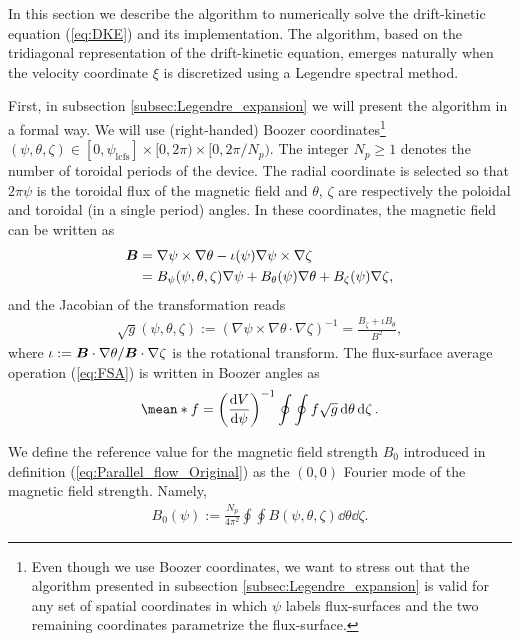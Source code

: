  In this section we describe the algorithm to numerically solve the drift-kinetic equation (\ref{eq:DKE}) and its implementation. The algorithm, based on the tridiagonal representation of the drift-kinetic equation, emerges naturally when the velocity coordinate $\xi$ is discretized using a Legendre spectral method.
 
 First, in subsection \ref{subsec:Legendre_expansion} we will present the algorithm in a formal way. We will use (right-handed) Boozer coordinates\footnote{Even though we use Boozer coordinates, we want to stress out that the algorithm presented in subsection \ref{subsec:Legendre_expansion} is valid for any set of spatial coordinates in which $\psi$ labels flux-surfaces and the two remaining coordinates parametrize the flux-surface.} $(\psi,\theta,\zeta)\in[0,\psi_{\text{lcfs}}]\times[0,2\pi)\times[0,2\pi/N_p)$. The integer $N_p\ge 1$ denotes the number of toroidal periods of the device. The radial coordinate is selected so that $2\pi \psi$ is the toroidal flux of the magnetic field and $\theta$, $\zeta$ are respectively the poloidal and toroidal (in a single period) angles. In these coordinates, the magnetic field can be written as
 \begin{align}
 	\vb*{B} & = \nabla\psi \times \nabla\theta - \iota(\psi) \nabla\psi \times \nabla\zeta 
 	\nonumber\\
 	& = B_\psi(\psi,\theta,\zeta) \nabla \psi + B_\theta(\psi) \nabla \theta + B_\zeta(\psi) \nabla \zeta,
 	\label{eq:Magnetic_field_Boozer}
 \end{align}
 and the Jacobian of the transformation reads 
 \begin{align}
 	\sqrt{g}(\psi,\theta,\zeta) 
 	:=( 
 	\nabla\psi \times \nabla \theta \cdot \nabla\zeta  
 	)^{-1} 
 	= 
 	\frac{B_\zeta + \iota B_\theta}{B^2},
 	\label{eq:Jacobian_Boozer}
 \end{align} 
 where $\iota :=\vb*{B} \cdot \nabla \theta / \vb*{B} \cdot \nabla \zeta $ is the rotational transform. The flux-surface average operation (\ref{eq:FSA}) is written in Boozer angles as
 \begin{align}
 	\mean*{f}
 	=
 	\left(\dv{V}{\psi}\right)^{-1}
 	\oint\oint
 	f
 	\sqrt{g}
 	\dd{\theta}\dd{\zeta}
 	.
 	\label{eq:FSA_Boozer}
 \end{align}
 
 We define the reference value for the magnetic field strength $B_0$ introduced in definition (\ref{eq:Parallel_flow_Original}) as the $(0,0)$ Fourier mode of the magnetic field strength. Namely, 
 \begin{align}
 	B_0(\psi) := \frac{N_p}{4\pi^2 } 
 	\oint\oint
 	B(\psi,\theta,\zeta)
 	\dd{\theta}\dd{\zeta}.
 \end{align}
 
